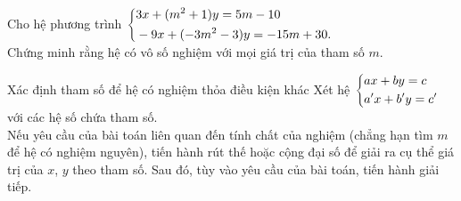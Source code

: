 \begin{vd}
	Cho hệ phương trình $\left\{\begin{aligned}&3x + (m^2+1)y = 5m - 10 \\& -9x + (-3m^2-3)y = -15m+30.\end{aligned}\right.$ \\
	Chứng minh rằng hệ có vô số nghiệm với mọi giá trị của tham số $m$.
\end{vd}
\begin{dang}{Xác định tham số để hệ có nghiệm thỏa điều kiện khác}
	Xét hệ $\left\{\begin{aligned}&ax + by = c\\&a'x + b'y = c'\end{aligned}\right.$ với các hệ số chứa tham số.\\
	
	Nếu yêu cầu của bài toán liên quan đến tính chất của nghiệm (chẳng hạn tìm $m$ để hệ có nghiệm nguyên), tiến hành rút thế hoặc cộng đại số để giải ra cụ thể giá trị của $x$, $y$ theo tham số. Sau đó, tùy vào yêu cầu của bài toán, tiến hành giải tiếp.
\end{dang}

